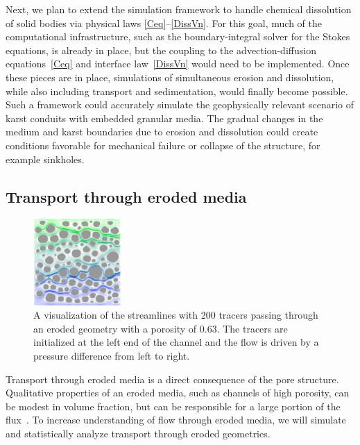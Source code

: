 \documentclass[11pt]{article}
\begin{document}
Next, we plan to extend the simulation framework to handle chemical dissolution of solid bodies via physical laws \eqref{Ceq}--\eqref{DissVn}. For this goal, much of the computational infrastructure, such as the boundary-integral solver for the Stokes equations, is already in place, but the coupling to the advection-diffusion equations~\eqref{Ceq} and interface law~\eqref{DissVn} would need to be implemented. Once these pieces are in place, simulations of simultaneous erosion and dissolution, while also including transport and sedimentation, would finally become possible. Such a framework could accurately simulate the geophysically relevant scenario of karst conduits with embedded granular media. The gradual changes in the medium and karst boundaries due to erosion and dissolution could create conditions favorable for mechanical failure or collapse of the structure, for example sinkholes.

 
\subsection{Transport through eroded media}

\begin{figure}
  \includegraphics[width=0.3\textwidth]{figs/100b_t100tracer}
  \caption{\label{fig:100tracers} A visualization of the streamlines
  with 200 tracers passing through an eroded geometry with a porosity of
  0.63. The tracers are initialized at the left end of the channel and
  the flow is driven by a pressure difference from left to right.}
\end{figure}

Transport through eroded media is a direct consequence of the pore structure. Qualitative properties of an eroded media, such as channels of high porosity, can be modest in volume fraction, but can be responsible for a large portion of the flux~\cite{Quaife2018}.  To increase understanding of flow through eroded media, we will simulate and statistically analyze transport through eroded geometries.
\end{document}
